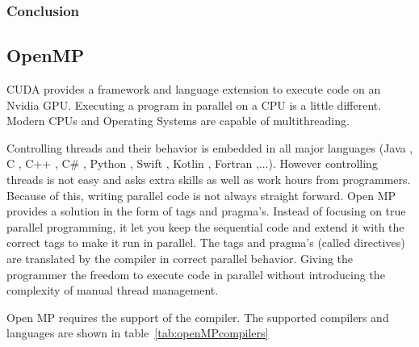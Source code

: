 \subsubsection{Conclusion}
\subsection{OpenMP}
CUDA provides a framework and language extension to execute code on an Nvidia GPU.
Executing a program in parallel on a CPU is a little different.
Modern CPUs and Operating Systems are capable of multithreading.

Controlling threads and their behavior is embedded in all major languages (Java \cite{Defining44:online}, C \cite{Threadsu13:online}, C++ \cite{Threadsu16:online}, C\# \cite{ThreadCl82:online}, Python \cite{threadin24:online}, Swift \cite{ThreadFo70:online}, Kotlin \cite{threadKo75:online}, Fortran \cite{Threadin70:online},...).
However controlling threads is not easy and asks extra skills as well as work hours from programmers.
Because of this, writing parallel code is not always straight forward.
Open MP provides a solution in the form of tags and pragma's.
Instead of focusing on true parallel programming, it let you keep the sequential code and extend it with the correct tags to make it run in parallel.
The tags and pragma's (called directives) are translated by the compiler in correct parallel behavior.
Giving the programmer the freedom to execute code in parallel without introducing the complexity of manual thread management.
\par 
Open MP requires the support of the compiler.
The supported compilers and languages are shown in table~\ref{tab:openMPcompilers}

